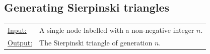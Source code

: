 % 
% 
% 


\subsection{Generating Sierpinski triangles}

\begin{tabular}{lp{10.5cm}}
\ul{Input:} & A single node labelled with a non-negative integer $n$. \\
\ul{Output:} & The Sierpinski triangle of generation $n$.
\end{tabular}
  
